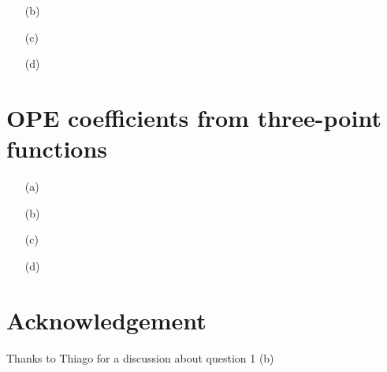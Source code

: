\documentclass[10pt, a4paper]{article}
\begin{document}
{\begin{enumerate}
  The current we are interested in is conserved as a result of the global symmetry $\psi \to e^{i\theta}\psi$, $\theta \in \mathbb{R}$. We note that applying the infinitesimal version of this symmetry transformation to the current leads to a vanishing variation $\delta j^\nu (x) = 0$. The ward identity corresponding to this symmetry reads 
  \begin{align*}
    \langle \partial^\mu j_\mu (x_1) j_\nu (x_2) \rangle = \delta(x_1 - x_2)\langle \delta j_\nu(x_2)\rangle = 0. 
  \end{align*} 
  We then compute the Fourier transformation with respect to $x_1, x_2$ to get 
  \begin{align*}
    0 = F[\langle  \partial^\mu  j_{\mu}^{V}(x_1) j_{\nu}^{V}(x_2) \rangle](q, p) 
    &= \int \text{d}^2x_1 e^{-i q \cdot  x_1} \int \text{d}^2x_2 e^{-i p \cdot  x_2} \langle \partial^{\mu} j_{\mu}^{V}(x_1) j_{\nu}^{V}(x_2) \rangle\\
    &=  \langle (+iq^{\mu})  \int \text{d}^2x_1 e^{-i q \cdot  x} j_{\mu}^{V}(x_1)   \int \text{d}^2x_2 e^{-i p \cdot  x}  j_{\nu}^{V}(x_2) \rangle\quad \text{with integration by parts}\\
    &= iq^{\mu} \langle  j_{\mu}^{V}(q)   j_{\nu}^{V}(p) \rangle
  \end{align*}
  At $q = -p$, we find $p^\mu \langle j_{\mu}^{V}(-p) \ j_{\nu}^{V}(p) \rangle = 0$ wich implies 
  \begin{align*}
    0=p^\mu \langle \ j_{\mu}^{V}(-p) \ j_{\nu}^{V}(p) \rangle &= p^\mu  \left(F_2(p^2)\eta_{\mu\nu} + F_3(p^2) p_\mu p_\nu\right) + F_{5}(p^2)p^\mu\left(\gamma_\mu p_\nu - \gamma_\nu p_\mu\right) \\
    &= \left(F_2(p^2) + F_3(p^2) p^2 \right)p_\nu + F_{5}(p^2) \left(p^\mu \gamma_\mu p_\nu - \gamma_\nu p^2\right), \forall p\\
    &\implies F_2(p^2) = -F_3(p^2) p^2, \quad F_5(p^2) = 0
  \end{align*}
  \item[(b)] 
  \item[(c)]
  \item[(d)] 
\end{enumerate}

\section{OPE coefficients from three-point functions}

\begin{enumerate}
  \item[(a)]
  \item[(b)] 
  \item[(c)]
  \item[(d)] 
\end{enumerate}


\section{Acknowledgement}

Thanks to Thiago for a discussion about question 1 (b)

}



\end{document}
